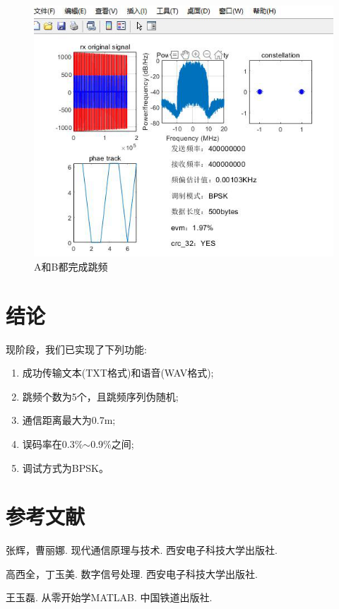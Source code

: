 \documentclass[12pt]{ctexart}
\begin{document}
\begin{figure}[htbp]
	\centering
 	\includegraphics[scale=0.6]{../figures/hop-a1b1.png}
	\caption{A和B都完成跳频}
	\label{hop-a1b1}
\end{figure}


\section{结论}

	现阶段，我们已实现了下列功能:
\begin{enumerate}
	\item 成功传输文本(TXT格式)和语音(WAV格式);
	\item 跳频个数为5个，且跳频序列伪随机;
	\item 通信距离最大为0.7m;
	\item 误码率在0.3\%$\sim$0.9\%之间;
	\item 调试方式为BPSK。
\end{enumerate}


\section{参考文献}

\noindent [1]张辉，曹丽娜. 现代通信原理与技术. 西安电子科技大学出版社.
 
\noindent [2]高西全，丁玉美. 数字信号处理. 西安电子科技大学出版社.
 
\noindent [3]王玉磊. 从零开始学MATLAB. 中国铁道出版社.
\end{document}
